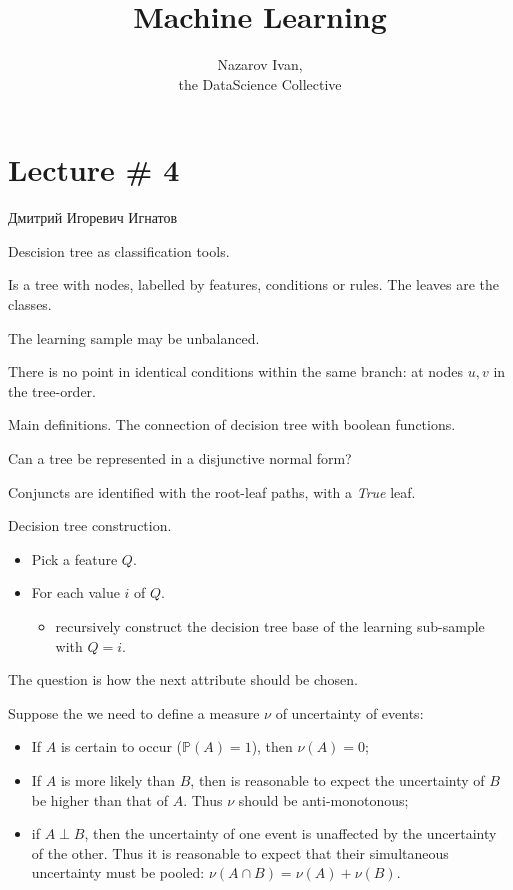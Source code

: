 \documentclass[a4paper]{article}
\title{Machine Learning}
\author{Nazarov Ivan, \rus{101мНОД(ИССА)}\\the DataScience Collective}
\newcommand{\pr}{\mathbb{P}}
\newcommand{\rus}[1]{\foreignlanguage{russian}{#1}}
\begin{document}
\maketitle

\section{Lecture \# 4} %
\label{sec:lecture_4}

\rus{Дмитрий Игоревич Игнатов}

Descision tree as classification tools.

Is a tree with nodes, labelled by features, conditions or rules. The leaves are the classes.

The learning sample may be unbalanced.

There is no point in identical conditions within the same branch: at nodes $u,v$ in the tree-order.

Main definitions.
The connection of decision tree with boolean functions.

Can a tree be represented in a disjunctive normal form?

Conjuncts are identified with the root-leaf paths, with a \emph{True} leaf.

Decision tree construction.
\begin{itemize}
	\item Pick a feature $Q$.
	\item For each value $i$ of $Q$.
	\begin{itemize}
		\item recursively construct the decision tree base of the learning sub-sample with $Q=i$.
	\end{itemize}
\end{itemize}

The question is how the next attribute should be chosen.

Suppose the we need to define a measure $\nu$ of uncertainty of events:\begin{itemize}
	\item If $A$ is certain to occur ($\pr(A)=1$), then $\nu(A)=0$;
	\item If $A$ is more likely than $B$, then is reasonable to expect the uncertainty of $B$ be higher than that of $A$. Thus $\nu$ should be anti-monotonous;
	\item if $A\perp B$, then the uncertainty of one event is unaffected by the uncertainty of the other. Thus it is reasonable to expect that their simultaneous uncertainty must be pooled: $\nu(A\cap B)= \nu(A)+\nu(B)$.
\end{itemize}
\end{document}

